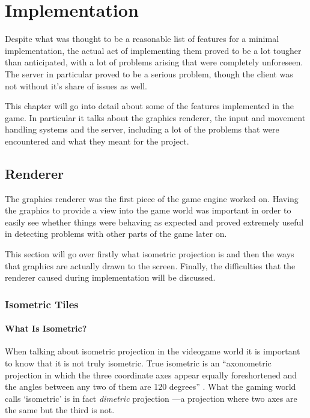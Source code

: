 \chapter{Implementation}

Despite what was thought to be a reasonable list of features for a minimal implementation, the actual act of implementing them proved to be a lot tougher than anticipated, with a lot of problems arising that were completely unforeseen. The server in particular proved to be a serious problem, though the client was not without it's share of issues as well.

This chapter will go into detail about some of the features implemented in the game. In particular it talks about the graphics renderer, the input and movement handling systems and the server, including a lot of the problems that were encountered and what they meant for the project.

\section{Renderer}
The graphics renderer was the first piece of the game engine worked on. Having the graphics to provide a view into the game world was important in order to easily see whether things were behaving as expected and proved extremely useful in detecting problems with other parts of the game later on.

This section will go over firstly what isometric projection is and then the ways that graphics are actually drawn to the screen. Finally, the difficulties that the renderer caused during implementation will be discussed.

\subsection{Isometric Tiles}

\subsubsection{What Is Isometric?}
When talking about isometric projection in the videogame world it is important to know that it is not truly isometric. True isometric is an ``axonometric projection in which the three coordinate axes appear equally foreshortened and the angles between any two of them are 120 degrees'' . What the gaming world calls `isometric' is in fact \textit{dimetric} projection ---a projection where two axes are the same but the third is not.

